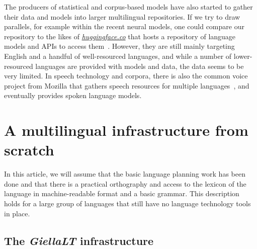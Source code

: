 \documentclass[free]{flammie}
\begin{document}
The producers of statistical and corpus-based models have also started to gather
their data and models into larger multilingual repositories. If we try to draw
parallels, for example within the recent neural models, one could compare our
repository to the likes of
\textit{\href{https://huggingface.co}{huggingface.co}} that hosts a repository
of language models and APIs to access them~\cite{wolf2020transformers}. However,
they are still mainly targeting English and a handful of well-resourced
languages, and while a number of lower-resourced languages are provided with
models and data, the data seems to be very limited.  In speech technology and
corpora, there is also the common voice project from Mozilla that gathers speech
resources for multiple languages~\cite{ardila2019common}, and eventually
provides spoken language models.


























\section{A multilingual infrastructure from scratch}\label{sec:infra}

In this article, we will assume that the basic language planning work has been
done and that there is a practical orthography and access to the lexicon of the
language in machine-readable format and a basic grammar. This description holds
for a large group of languages that still have no language technology tools in
place.


















\subsection{The \textit{GiellaLT} infrastructure}
\end{document}
